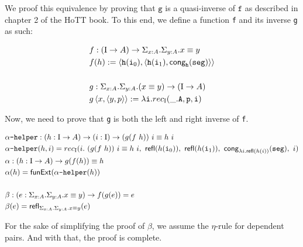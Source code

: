 \documentclass[12pt,twoside,maitrise]{dms}
\theoremstyle{definition}
\numberwithin{equation}{section}
\numberwithin{table}{chapter}
\numberwithin{figure}{chapter}
\newcommand\kw[1] {\textsf{#1}}
\newcommand\id[1] {\texttt{#1}}
\newcommand\fn[1] {\texttt{#1}}
\begin{document}
We proof this equivalence by proving that $\fn{g}$ is a quasi-inverse of
$\fn{f}$ as described in chapter 2 of the HoTT book\cite{HoTTbook}. To this end,
we define a function \id{f} and its inverse \id{g} as such:


\begin{align*}
  & f : (\bI \rightarrow A) \rightarrow \Sigma_{\oftype{x}{A}} . \Sigma_{\oftype{y}{A}} . \eqtype{x}{y} \\
  & f(h) := \braket{\id{h}(\ileft), \braket{\id{h}(\iright), \kw{cong}_{\id{h}}(\id{seg})}} \\ \\
  & g : \Sigma_{\oftype{x}{A}} . \Sigma_{\oftype{y}{A}} . (\eqtype{x}{y}) \rightarrow  (\bI \rightarrow A) \\
  & g \braket{x, \braket{y, p}} := \lambda \id{i} . rec_{\bI}(\_ . \id{A}, \id{p}, \id{i})
\end{align*}

Now, we need to prove that \id{g} is both the left and right inverse of \id{f}.

\begin{align*}
  & \id{$\alpha$-helper} : (\oftype{h}{\bI \rightarrow A}) \rightarrow (\oftype{i}{\bI}) \rightarrow \eqtype{(g (f \ h)) \ i}{h \ i} \\
  & \id{$\alpha$-helper} (h , i) = rec_{\bI}(i . \ \eqtype{(g (f \ h)) \ i}{h \ i}, \ \refl{h(\ileft)}, \ \refl{h(\iright)}, \ \kw{cong}_{\lambda i . \refl{h(i)}}(\id{seg}), \ i) \\
  & \alpha : (\oftype{h}{\bI \rightarrow A}) \rightarrow \eqtype{g(f(h))}{h} \\
  & \alpha(h) =  \kw{funExt} (\id{$\alpha$-helper} (h)) \\ \\
  & \beta :  (\oftype{e}{\Sigma_{\oftype{x}{A}} . \Sigma_{\oftype{y}{A}} . \eqtype{x}{y}}) \rightarrow f(g(e)) = e \\
  & \beta(e) =  \refl{\Sigma_{\oftype{x}{A}} . \Sigma_{\oftype{y}{A}} . \eqtype{x}{y}}{e}
\end{align*}

For the sake of simplifying the proof of $\beta$, we assume the $\eta$-rule for
dependent pairs. And with that, the proof is complete.
\end{document}
